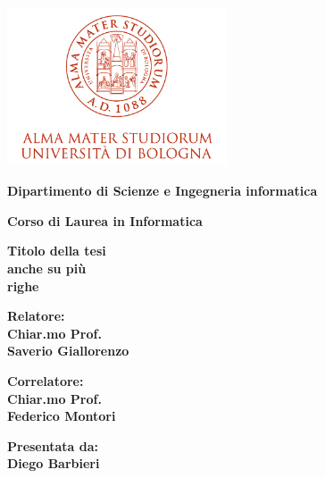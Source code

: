 \documentclass[12pt,a4paper,twoside]{book}
\begin{document}
\pagestyle{empty}

\begin{titlepage}

\begin{center}

\includegraphics[width=6.5cm,height=4.7cm]{img/marchio-di-ateneo.png}

\vspace{10mm}

{\large{\bf{Dipartimento di Scienze e Ingegneria informatica}}} 

\vspace{5mm}

{\Large{\bf{Corso di Laurea in Informatica}}}

\vspace{15mm}

{\Huge{\bf Titolo della tesi }}\\
\vspace{3mm}
{\Huge{\bf anche su più}}\\
\vspace{3mm}
{\Huge{\bf righe }}\\
\vspace{3mm}

\end{center}

\vspace{10mm}

\begin{minipage}[t]{0.40\textwidth}
{\Large{\bf Relatore: \\ Chiar.mo Prof.\\ Saverio Giallorenzo}}

\vspace{3mm}

{\Large{\bf Correlatore: \\ Chiar.mo Prof.\\ Federico Montori}}
\end{minipage}
\hfill
\begin{minipage}[t]{0.40\textwidth}\raggedleft
{\Large{\bf Presentata da: \\ Diego Barbieri}}
\end{minipage}


\end{titlepage}
\end{document}
